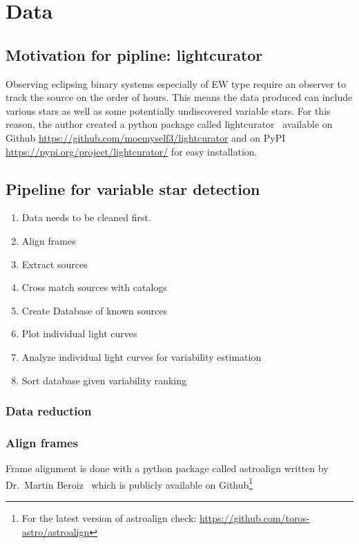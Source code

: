 \chapter{Data}
\label{chp:data}

\section{Motivation for pipline: lightcurator}
Observing eclipsing binary systems especially of EW type require an observer to track the source on the order of hours.
This means the data produced can include various stars as well as some potentially undiscovered variable stars.
For this reason, the author created a python package called lightcurator~\cite{castillo_2019} available on Github \url{https://github.com/moemyself3/lightcurator}
and on PyPI \url{https://pypi.org/project/lightcurator/} for easy installation.

\section{Pipeline for variable star detection}
\begin{enumerate}
    \item Data needs to be cleaned first.
    \item Align frames
    \item Extract sources
    \item Cross match sources with catalogs
    \item Create Database of known sources
    \item Plot individual light curves
    \item Analyze individual light curves for variability estimation
    \item Sort database given variability ranking
\end{enumerate}

\subsection{Data reduction}
\subsection{Align frames}
Frame alignment is done with a python package called astroalign written by Dr.\ Martin Beroiz~\cite{beroiz_2019} which is publicly
available on Github\footnote{For the latest version of astroalign check: \url{https://github.com/toros-astro/astroalign}}

